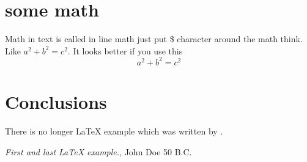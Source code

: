 \documentclass[12pt, a4paper, twoside, titlepage]{article}
\begin{document}
\section{some math}
Math in text is called in line math just put \$ character around
the math think. Like $ a^2 + b^2 = c^2 $. It looks better if you use
this
\[a^2 + b^2 = c^2\]

\section{Conclusions}\label{conclusions}
There is no longer \LaTeX{} example which was written by \cite{doe}.

\begin{thebibliography}{9}
 \emph{First and last \LaTeX{} example.},
John Doe 50 B.C.
\end{thebibliography}
\end{document}
